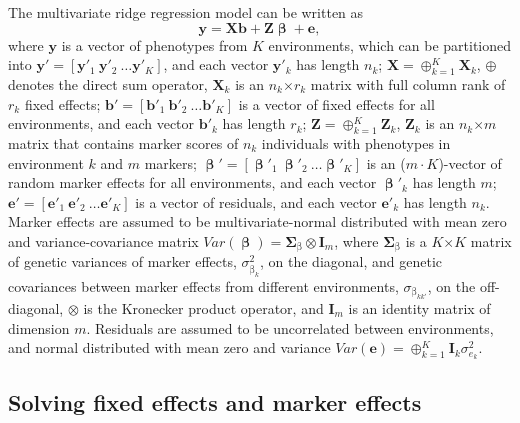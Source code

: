 \documentclass{bmcart}
\begin{document}
The multivariate ridge regression model can be written as
\begin{equation}\label{eqn:StatModel}
\mathbf{y} = \mathbf{X}\mathbf{b} + \mathbf{Z}\mathbf{\upbeta} + \mathbf{e},
\end{equation}
where $\mathbf{y}$ is a vector of phenotypes from $K$ environments, which can be partitioned into $\mathbf{y}' = [\mathbf{y}'_1 ~ \mathbf{y}'_2 ~ \hdots \mathbf{y}'_K]$, and each vector $\mathbf{y}'_k$ has length $n_k$;
$\mathbf{X} = \oplus_{k=1}^{K}\mathbf{X}_k$, $\oplus$ denotes the direct sum operator, $\mathbf{X}_k$ is an $n_k$$\times$$r_k$ matrix with full column rank of $r_k$ fixed effects; $\mathbf{b}' = [\mathbf{b}'_1 ~ \mathbf{b}'_2 ~ \hdots \mathbf{b}'_K]$ is a vector of fixed effects for all environments, and each vector $\mathbf{b}'_k$ has length $r_k$;
$\mathbf{Z} = \oplus_{k=1}^{K}\mathbf{Z}_k$, $\mathbf{Z}_k$ is an $n_k$$\times$$m$ matrix that contains marker scores of $n_k$ individuals with phenotypes in environment $k$ and $m$ markers; $\mathbf{\upbeta}' = [\mathbf{\upbeta}'_1 ~ \mathbf{\upbeta}'_2 ~ \hdots \mathbf{\upbeta}'_K]$ is an ($m\cdot K$)-vector of random marker effects for all environments, and each vector $\mathbf{\upbeta}'_k$ has length $m$; $\mathbf{e}' = [\mathbf{e}'_1 ~ \mathbf{e}'_2 ~ \hdots \mathbf{e}'_K]$ is a vector of residuals, and each vector $\mathbf{e}'_k$ has length $n_k$. 
Marker effects are assumed to be multivariate-normal distributed with mean zero and variance-covariance matrix $Var(\mathbf{\upbeta}) = \mathbf{\Sigma}_{\upbeta}\otimes\mathbf{I}_{m}$, where $\mathbf{\Sigma}_{\upbeta}$ is a $K$$\times$$K$ matrix of genetic variances of marker effects, $\sigma^2_{\upbeta_k}$, on the diagonal, and genetic covariances between marker effects from different environments, $\sigma_{\upbeta_{kk'}}$, on the off-diagonal, $\otimes$ is the Kronecker product operator, and $\mathbf{I}_m$ is an identity matrix of dimension $m$. Residuals are assumed to be uncorrelated between environments, and normal distributed with mean zero and variance $Var(\mathbf{e}) = \oplus_{k=1}^K\mathbf{I}_k\sigma^2_{e_k}$.

\subsection{Solving fixed effects and marker effects}
\end{document}
